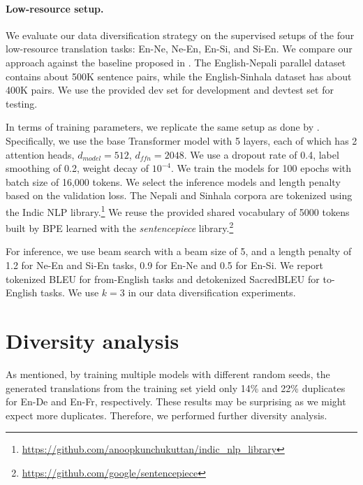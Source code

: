 \documentclass{article}
\begin{document}
\paragraph{Low-resource setup.} We evaluate our data diversification strategy on the supervised setups of the four low-resource translation tasks: En-Ne, Ne-En, En-Si, and Si-En. We compare our approach against the baseline proposed in \citep{flores}. The  English-Nepali parallel dataset contains about 500K sentence pairs, while the English-Sinhala dataset has about 400K pairs. We use the provided dev set for development and devtest set for testing.

In terms of training parameters, we replicate the same setup as done by \citet{flores}. Specifically, we use the base Transformer model with 5 layers, each of which has 2 attention heads, $d_{model}=512$, $d_{ffn}=2048$. We use a dropout rate of 0.4, label smoothing of 0.2, weight decay of $10^{-4}$. We train the models for 100 epochs with batch size of 16,000 tokens. We select the inference models and length penalty based on the validation loss. The Nepali and Sinhala corpora are tokenized using the Indic NLP library.\footnote{\href{https://github.com/anoopkunchukuttan/indic\_nlp\_library}{https://github.com/anoopkunchukuttan/indic\_nlp\_library}} We reuse the provided shared vocabulary of 5000 tokens built by BPE learned with the \textit{sentencepiece} library.\footnote{\href{https://github.com/google/sentencepiece}{https://github.com/google/sentencepiece}} 

For inference, we use beam search with a beam size of 5, and a length penalty of 1.2 for Ne-En and  Si-En tasks, 0.9 for En-Ne and 0.5 for En-Si. We report tokenized BLEU for from-English tasks and detokenized SacredBLEU \citep{sacredbleu_post-2018-call} for to-English tasks. 
We use $k=3$ in our data diversification experiments. 



\section{Diversity analysis}\label{app:diversity}


As mentioned, by training multiple models with different random seeds, the generated translations from the training set yield only 14\% and 22\% duplicates for En-De and En-Fr, respectively. These results may be surprising as we might expect more duplicates. Therefore, we performed further diversity analysis. 
\end{document}

